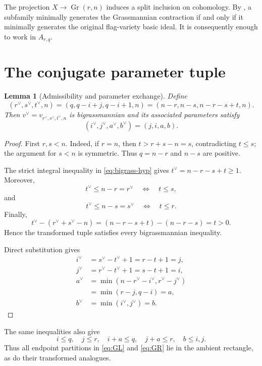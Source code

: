 \documentclass[11pt]{amsart}
\newtheorem{lemma}[theorem]{Lemma}
\theoremstyle{definition}
\theoremstyle{remark}
\newcommand{\Gr}{\operatorname{Gr}}
\begin{document}
The projection $X\to\Gr(r,n)$ induces a split inclusion on cohomology.  By
\cite[lines 207--211 in the arXiv source]{SDY}, a subfamily minimally
generates the Grassmannian contraction if and only if it minimally generates
the original flag-variety basic ideal.  It is consequently enough to work in
$A_{r,q}$.

\section{The conjugate parameter tuple}

\begin{lemma}[Admissibility and parameter exchange]\label{lem:parameters}
Define
\begin{equation}\label{eq:vee-tuple}
  (r^\vee,s^\vee,t^\vee,n)
  =(q,q-i+j,q-i+1,n)
  =(n-r,n-s,n-r-s+t,n).
\end{equation}
Then $v^\vee=v_{r^\vee,s^\vee,t^\vee,n}$ is bigrassmannian and its associated
parameters satisfy
\[
  (i^\vee,j^\vee,a^\vee,b^\vee)=(j,i,a,b).
\]
\end{lemma}

\begin{proof}
First $r,s<n$.  Indeed, if $r=n$, then
$t>r+s-n=s$, contradicting $t\leq s$; the argument for $s<n$ is symmetric.
Thus $q=n-r$ and $n-s$ are positive.

The strict integral inequality in \eqref{eq:bigrass-hyp} gives
$t^\vee=n-r-s+t\geq1$.  Moreover,
\[
  t^\vee\leq n-r=r^\vee \quad\Longleftrightarrow\quad t\leq s,
\]
and
\[
  t^\vee\leq n-s=s^\vee \quad\Longleftrightarrow\quad t\leq r.
\]
Finally,
\[
 t^\vee-(r^\vee+s^\vee-n)
 =(n-r-s+t)-(n-r-s)=t>0.
\]
Hence the transformed tuple satisfies every bigrassmannian inequality.

Direct substitution gives
\begin{align*}
 i^\vee&=s^\vee-t^\vee+1=r-t+1=j,\\
 j^\vee&=r^\vee-t^\vee+1=s-t+1=i,\\
 a^\vee
 &=\min(n-r^\vee-i^\vee,r^\vee-j^\vee)\\
 &=\min(r-j,q-i)=a,\\
 b^\vee&=\min(i^\vee,j^\vee)=b.
\end{align*}
\end{proof}

The same inequalities also give
\begin{equation}\label{eq:box-ineq}
  i\leq q,
  \quad j\leq r,
  \quad i+a\leq q,
  \quad j+a\leq r,
  \quad b\leq i,j.
\end{equation}
Thus all endpoint partitions in \eqref{eq:GL} and \eqref{eq:GR} lie in the
ambient rectangle, as do their transformed analogues.
\end{document}
